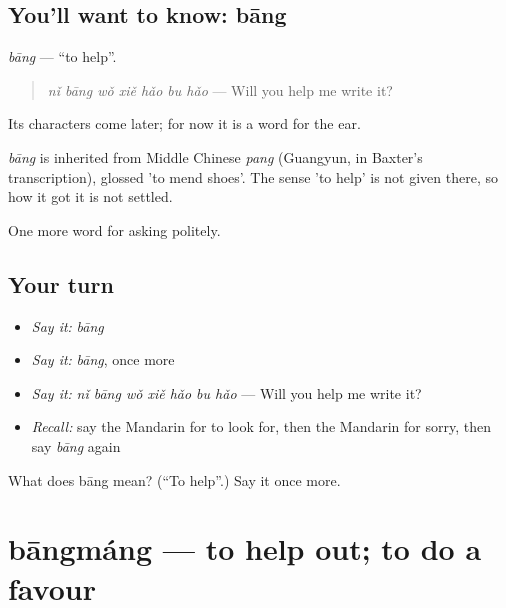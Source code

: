 \subsection*{You'll want to know: bāng}
\emph{bāng} — \textquotedblleft{}to help\textquotedblright{}.

\begin{quote}
\emph{nǐ bāng wǒ xiě hǎo bu hǎo} — Will you help me write it?
\end{quote}

Its characters come later; for now it is a word for the ear.

\begin{cousinweb}
\emph{bāng} is inherited from Middle Chinese \emph{pang} (Guangyun, in Baxter's transcription), glossed 'to mend shoes'. The sense 'to help' is not given there, so how it got it is not settled.
\end{cousinweb}

\begin{grammarlens}[title={What you've built}]
One more word for asking politely.
\end{grammarlens}

\subsection*{Your turn}
\begin{itemize}
\raggedright
  \item \emph{Say it:} \emph{bāng}
  \item \emph{Say it:} \emph{bāng}, once more
  \item \emph{Say it:} \emph{nǐ bāng wǒ xiě hǎo bu hǎo} — Will you help me write it?
  \item \emph{Recall:} say the Mandarin for to look for, then the Mandarin for sorry, then say \emph{bāng} again
\end{itemize}

\begin{tcolorbox}[breakable,colback=teal!4,colframe=teal!35!black,title={Before you move on}]
What does bāng mean? (\textquotedblleft{}To help\textquotedblright{}.) Say it once more.
\end{tcolorbox}
\section[bāngmáng]{bāngmáng — to help out; to do a favour}

\label{lesson:ZH-C64-bangmang}



